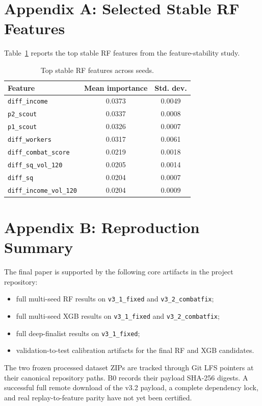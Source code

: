 \documentclass[11pt,a4paper]{article}
\begin{document}
\appendix
\section{Appendix A: Selected Stable RF Features}
Table~\ref{tab:rffeatures} reports the top stable RF features from the feature-stability study.

\begin{table}[H]
\centering
\caption{Top stable RF features across seeds.}
\label{tab:rffeatures}
\begin{tabular}{lcc}
\toprule
Feature & Mean importance & Std. dev. \\
\midrule
\texttt{diff\_income} & 0.0373 & 0.0049 \\
\texttt{p2\_scout} & 0.0337 & 0.0008 \\
\texttt{p1\_scout} & 0.0326 & 0.0007 \\
\texttt{diff\_workers} & 0.0317 & 0.0061 \\
\texttt{diff\_combat\_score} & 0.0219 & 0.0018 \\
\texttt{diff\_sq\_vol\_120} & 0.0205 & 0.0014 \\
\texttt{diff\_sq} & 0.0204 & 0.0007 \\
\texttt{diff\_income\_vol\_120} & 0.0204 & 0.0009 \\
\bottomrule
\end{tabular}
\end{table}

\section{Appendix B: Reproduction Summary}
The final paper is supported by the following core artifacts in the project repository:
\begin{itemize}
    \item full multi-seed RF results on \texttt{v3\_1\_fixed} and \texttt{v3\_2\_combatfix};
    \item full multi-seed XGB results on \texttt{v3\_1\_fixed} and \texttt{v3\_2\_combatfix};
    \item full deep-finalist results on \texttt{v3\_1\_fixed};
    \item validation-to-test calibration artifacts for the final RF and XGB candidates.
\end{itemize}
The two frozen processed dataset ZIPs are tracked through Git LFS pointers at their canonical repository paths. B0 records their payload SHA-256 digests. A successful full remote download of the v3.2 payload, a complete dependency lock, and real replay-to-feature parity have not yet been certified.
\end{document}
